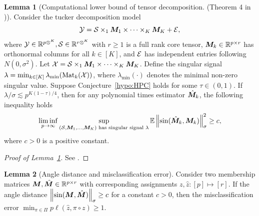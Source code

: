 \documentclass[lettersize,onecolumn,journal]{IEEEtran}
\theoremstyle{definition}
\newtheorem{lem}{Lemma}
\theoremstyle{definition}
\newcommand{\Mat}{\text{Mat}}
\def\fixme#1#2{\textbf{\color{red}[FIXME (#1): #2]}}
\begin{document}
\begin{lem}[Computational lower bound of tensor decomposition. (Theorem 4 in \cite{zhang2018tensor})]\label{lem:hpc} Consider the tucker decomposition model 
\begin{equation}
    \mathcal{Y} = \mathcal{S} \times_1 \bm M_1 \times \cdots \times_K \bm M_K + \mathcal{E},
\end{equation}
where $\mathcal{Y} \in \mathbb{R}^{p\otimes^K }, \mathcal{S} \in \mathbb{R}^{r \otimes^K}$ with $r \geq 1$ is a full rank core tensor, $\bm M_k \in \mathbb{R}^{p \times r}$ has orthonormal columns for all $k \in [K]$, and $\mathcal{E}$ has independent entries following $N(0,\sigma^2)$. Let $\mathcal{X} = \mathcal{S} \times_1 \bm M_1 \times \cdots \times_K \bm M_K $. Define the singular signal $\lambda = \min_{k \in [K]}\lambda_{\min} (\Mat_k(\tX))$, where $\lambda_{\min}(\cdot)$ denotes the minimal non-zero singular value. Suppose Conjecture~\ref{hypo:HPC} holds for some $\tau \in (0,1)$. If $\lambda /\sigma \lesssim p^{K(1- \tau)/4}$, then for any polynomial times estimator $\hat {\bm M}_k$, the following inequality holds
\begin{align}
    \liminf_{p \rightarrow \infty} \sup_{(\mathcal{S}, \bm M_1,...,\bm M_K) \text{ has singular signal }\lambda} \mathbb{E} \left\lVert \sin(\hat {\bm M}_k, \bm M_k) \right\rVert^2_{\sigma} \geq c,
\end{align}
where $c >0$ is a positive constant. 
\end{lem}

\begin{proof}[Proof of Lemma~\ref{lem:hpc}]
See \citet[Proof of Theorem 4]{zhang2018tensor}.
\end{proof}


\begin{lem}[Angle distance and misclassification error]\label{lem:angle_mcr} Consider two membership matrices $\bm M, \hat {\bm M} \in \mathbb{R}^{p \times r}$ with corresponding assignments $z, \hat z: [p] \mapsto [r]$. If the angle distance $\left\lVert\sin (\bm M, \hat {\bm M})\right\rVert_{\sigma} \geq c$ for a constant $c >0$, then the misclassification error $\min_{\pi \in \Pi}p\ell(\hat z,\pi \circ z )\geq 1$.
\end{lem}
\end{document}
